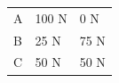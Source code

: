 \begin{enumerate}[noitemsep, label=\textbf{\arabic*}. ]
{\begin{center}
\begin{xtabular*}{\mytablewidth}[t]{|p{10\mystarwidth}|p{10\mystarwidth}|p{10\mystarwidth}|}
        A &
    
    
        100 N &
    
    
        0 N%
     \tabularnewline{}
    
    
        B &
    
    
        25 N &
    
    
        75 N%
     \tabularnewline{}
    
    
        C &
    
    
        50 N &
    
    
        50 N%
     \tabularnewline{}
    

\end{xtabular*}
\end{center}}
\end{enumerate}
